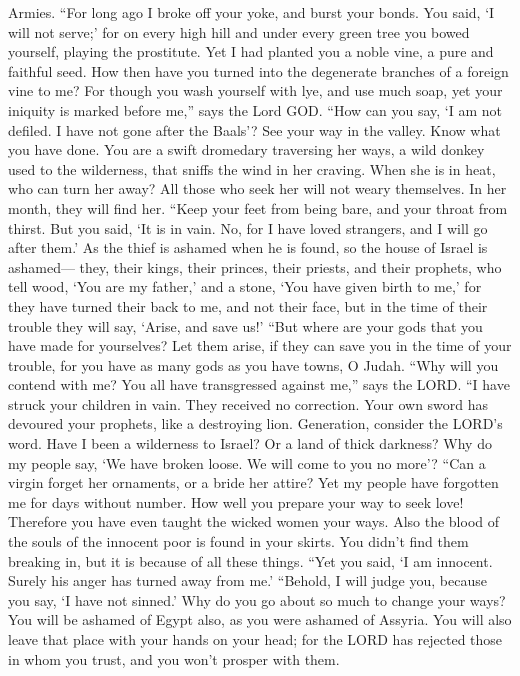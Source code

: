 Armies.  ``For long ago I broke off your yoke, and burst
your bonds. You said, `I will not serve;' for on every high hill and
under every green tree you bowed yourself, playing the prostitute.
 Yet I had planted you a noble vine, a pure and faithful
seed. How then have you turned into the degenerate branches of a foreign
vine to me?  For though you wash yourself with lye, and use
much soap, yet your iniquity is marked before me,'' says the Lord GOD.
 ``How can you say, `I am not defiled. I have not gone
after the Baals'? See your way in the valley. Know what you have done.
You are a swift dromedary traversing her ways,  a wild
donkey used to the wilderness, that sniffs the wind in her craving. When
she is in heat, who can turn her away? All those who seek her will not
weary themselves. In her month, they will find her.  ``Keep
your feet from being bare, and your throat from thirst. But you said,
`It is in vain. No, for I have loved strangers, and I will go after
them.'  As the thief is ashamed when he is found, so the
house of Israel is ashamed--- they, their kings, their princes, their
priests, and their prophets,  who tell wood, `You are my
father,' and a stone, `You have given birth to me,' for they have turned
their back to me, and not their face, but in the time of their trouble
they will say, `Arise, and save us!'  ``But where are your
gods that you have made for yourselves? Let them arise, if they can save
you in the time of your trouble, for you have as many gods as you have
towns, O Judah.  ``Why will you contend with me? You all
have transgressed against me,'' says the LORD.  ``I have
struck your children in vain. They received no correction. Your own
sword has devoured your prophets, like a destroying lion. 
Generation, consider the LORD's word. Have I been a wilderness to
Israel? Or a land of thick darkness? Why do my people say, `We have
broken loose. We will come to you no more'?  ``Can a virgin
forget her ornaments, or a bride her attire? Yet my people have
forgotten me for days without number.  How well you prepare
your way to seek love! Therefore you have even taught the wicked women
your ways.  Also the blood of the souls of the innocent
poor is found in your skirts. You didn't find them breaking in, but it
is because of all these things.  ``Yet you said, `I am
innocent. Surely his anger has turned away from me.' ``Behold, I will
judge you, because you say, `I have not sinned.'  Why do
you go about so much to change your ways? You will be ashamed of Egypt
also, as you were ashamed of Assyria.  You will also leave
that place with your hands on your head; for the LORD has rejected those
in whom you trust, and you won't prosper with them.

